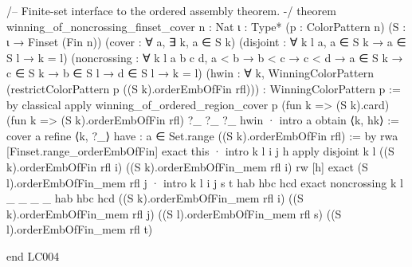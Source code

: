 \documentclass[11pt,reqno]{amsart}
\theoremstyle{definition}
\begin{document}
\begin{LeanCode}
/-- Finite-set interface to the ordered assembly theorem. -/
theorem winning_of_noncrossing_finset_cover {n : Nat} {ι : Type*}
    (p : ColorPattern n) (S : ι → Finset (Fin n))
    (cover : ∀ a, ∃ k, a ∈ S k)
    (disjoint : ∀ k l a, a ∈ S k → a ∈ S l → k = l)
    (noncrossing : ∀ k l a b c d, a < b → b < c → c < d →
      a ∈ S k → c ∈ S k → b ∈ S l → d ∈ S l → k = l)
    (hwin : ∀ k, WinningColorPattern
      (restrictColorPattern p ((S k).orderEmbOfFin rfl))) :
    WinningColorPattern p := by
  classical
  apply winning_of_ordered_region_cover p (fun k => (S k).card)
    (fun k => (S k).orderEmbOfFin rfl) ?_ ?_ ?_ hwin
  · intro a
    obtain ⟨k, hk⟩ := cover a
    refine ⟨k, ?_⟩
    have : a ∈ Set.range ((S k).orderEmbOfFin rfl) := by
      rwa [Finset.range_orderEmbOfFin]
    exact this
  · intro k l i j h
    apply disjoint k l ((S k).orderEmbOfFin rfl i)
      ((S k).orderEmbOfFin_mem rfl i)
    rw [h]
    exact (S l).orderEmbOfFin_mem rfl j
  · intro k l i j s t hab hbc hcd
    exact noncrossing k l _ _ _ _ hab hbc hcd
      ((S k).orderEmbOfFin_mem rfl i) ((S k).orderEmbOfFin_mem rfl j)
      ((S l).orderEmbOfFin_mem rfl s) ((S l).orderEmbOfFin_mem rfl t)

end LC004
\end{LeanCode}
\end{document}
